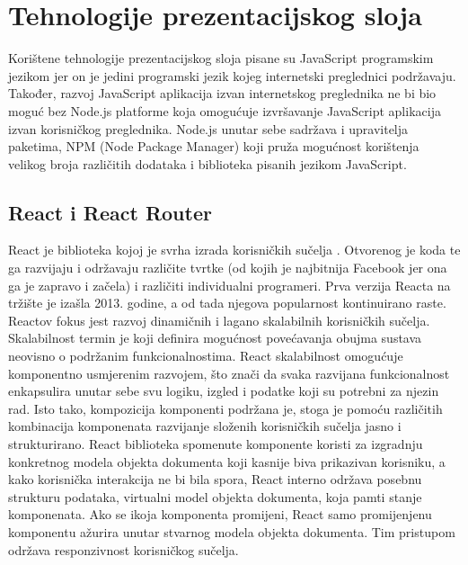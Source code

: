 \documentclass[times, utf8, zavrsni]{fer}
\begin{document}
	\section{Tehnologije prezentacijskog sloja}
	Korištene tehnologije prezentacijskog sloja pisane su JavaScript programskim jezikom jer on je jedini programski jezik kojeg internetski preglednici podržavaju. Također, razvoj JavaScript aplikacija izvan internetskog preglednika ne bi bio moguć bez Node.js platforme koja omogućuje izvršavanje JavaScript aplikacija izvan korisničkog preglednika. Node.js unutar sebe sadržava i upravitelja paketima, NPM (Node Package Manager) koji pruža mogućnost korištenja velikog broja različitih dodataka i biblioteka pisanih jezikom JavaScript.
		\subsection{React i React Router}
		React je biblioteka kojoj je svrha izrada korisničkih sučelja . Otvorenog je koda te ga razvijaju i održavaju različite tvrtke (od kojih je najbitnija Facebook jer ona ga je zapravo i začela) i različiti individualni programeri. Prva verzija Reacta na tržište je izašla 2013. godine, a od tada njegova popularnost kontinuirano raste. Reactov fokus jest razvoj dinamičnih i lagano skalabilnih korisničkih sučelja. Skalabilnost  termin je koji definira mogućnost povećavanja obujma sustava neovisno o podržanim funkcionalnostima. React skalabilnost omogućuje komponentno usmjerenim razvojem, što znači da svaka razvijana funkcionalnost enkapsulira unutar sebe svu logiku, izgled i podatke koji su potrebni za njezin rad. Isto tako, kompozicija komponenti podržana je, stoga je pomoću različitih kombinacija komponenata razvijanje složenih korisničkih sučelja jasno i strukturirano. React biblioteka spomenute komponente koristi za izgradnju konkretnog modela objekta dokumenta  koji kasnije biva prikazivan korisniku, a kako korisnička interakcija ne bi bila spora, React interno održava posebnu strukturu podataka, virtualni model objekta dokumenta, koja pamti stanje komponenata. Ako se ikoja komponenta promijeni, React samo promijenjenu komponentu ažurira unutar stvarnog modela objekta dokumenta. Tim pristupom održava responzivnost korisničkog sučelja.\\
\end{document}
